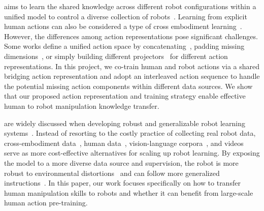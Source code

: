  aims to learn the shared knowledge across different robot configurations within a unified model to control a diverse collection of robots~\cite{o2024open,team2024octo,black2024pi_0,intelligence2025pi_0.5,yang2024pushing}.
% 
Learning from explicit human actions can also be considered a type of cross embodiment learning~\cite{kareer2025egomimic,punamiya2025egobridge,zheng2026egoscale,zhu2026emma}.
% 
However, the differences among action representations pose significant challenges.
% 
Some works define a unified action space by concatenating~\cite{liu2024rdt,cheang2025gr3,kareer2025egomimic}, padding missing dimensions~\cite{black2024pi_0,pertsch2025fast,intelligence2025pi_0.5}, or simply building different projectors~\cite{wang2024scaling,bjorck2025gr00t} for different action representations.
% 
In this project, we co-train human and robot actions via a shared bridging action representation and adopt an interleaved action sequence to handle the potential missing action components within different data sources.
% 
We show that our proposed action representation and training strategy enable effective human to robot manipulation knowledge transfer.



 are widely discussed when developing robust and generalizable robot learning systems~\cite{bjorck2025gr00t,barreiros2025careful,lin2026systematic,generalist2026gen1,cheang2025gr3}.
% 
Instead of resorting to the costly practice of collecting real robot data, cross-embodiment data~\cite{o2024open,kim2024openvla,liu2024rdt,black2024pi_0,intelligence2025pi_0.5}, human data~\cite{kareer2025egomimic,zheng2026egoscale,cheang2025gr3}, vision-language corpora~\cite{goyal2017making,chen2015microsoft,li2024llava,zitkovich2023rt2,wu2026pragmatic}, and videos~\cite{bu2025agibot,bjorck2025gr00t,cheang2024gr,wu2023unleashing,hu2024video,ye2026world,li2026causal} serve as more cost-effective alternatives for scaling up robot learning.
% 
By exposing the model to a more diverse data source and supervision, the robot is more robust to environmental distortions~\cite{cheang2025gr3,intelligence2025pi_0.5,lin2026systematic} and can follow more generalized instructions~\cite{zitkovich2023rt2,cheang2025gr3}.
% 
In this paper, our work focuses specifically on how to transfer human manipulation skills to robots and whether it can benefit from large-scale human action pre-training.